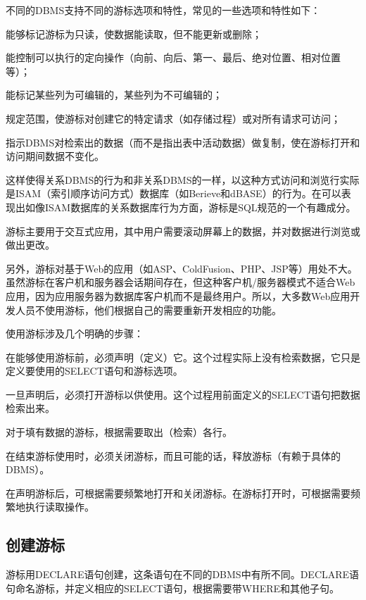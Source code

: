 不同的DBMS支持不同的游标选项和特性，常见的一些选项和特性如下：

\begin{compactitem}
\item 能够标记游标为只读，使数据能读取，但不能更新或删除；
\item 能控制可以执行的定向操作（向前、向后、第一、最后、绝对位置、相对位置等）；
\item 能标记某些列为可编辑的，某些列为不可编辑的；
\item 规定范围，使游标对创建它的特定请求（如存储过程）或对所有请求可访问；
\item 指示DBMS对检索出的数据（而不是指出表中活动数据）做复制，使在游标打开和访问期间数据不变化。
\end{compactitem}

这样使得关系DBMS的行为和非关系DBMS的一样，以这种方式访问和浏览行实际是ISAM（索引顺序访问方式）数据库（如Berieve和dBASE）的行为。在可以表现出如像ISAM数据库的关系数据库行为方面，游标是SQL规范的一个有趣成分。

游标主要用于交互式应用，其中用户需要滚动屏幕上的数据，并对数据进行浏览或做出更改。

另外，游标对基于Web的应用（如ASP、ColdFusion、PHP、JSP等）用处不大。虽然游标在客户机和服务器会话期间存在，但这种客户机/服务器模式不适合Web应用，因为应用服务器为数据库客户机而不是最终用户。所以，大多数Web应用开发人员不使用游标，他们根据自己的需要重新开发相应的功能。

使用游标涉及几个明确的步骤：

\begin{compactitem}
\item 在能够使用游标前，必须声明（定义）它。这个过程实际上没有检索数据，它只是定义要使用的SELECT语句和游标选项。
\item 一旦声明后，必须打开游标以供使用。这个过程用前面定义的SELECT语句把数据检索出来。
\item 对于填有数据的游标，根据需要取出（检索）各行。
\item 在结束游标使用时，必须关闭游标，而且可能的话，释放游标（有赖于具体的DBMS）。
\item 在声明游标后，可根据需要频繁地打开和关闭游标。在游标打开时，可根据需要频繁地执行读取操作。
\end{compactitem}

\subsection{创建游标}


游标用DECLARE语句创建，这条语句在不同的DBMS中有所不同。DECLARE语句命名游标，并定义相应的SELECT语句，根据需要带WHERE和其他子句。

